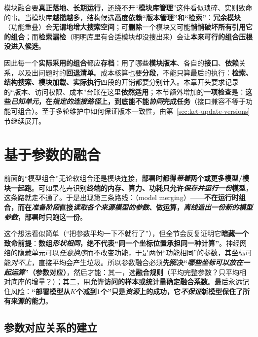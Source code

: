模块融合要\textbf{真正落地、长期运行}，还绕不开“\textbf{模块库管理}”这件看似琐碎、实则致命的事。当模块库\textbf{越攒越多}，结构候选\textbf{高度依赖“版本管理”和“检索”}：\textbf{冗余模块}（功能重叠）会\textbf{无谓地增大搜索空间}；可\textbf{删除}一个模块又可能\textbf{悄悄破坏所有引用它的组合}；而\textbf{检索漏检}（明明库里有合适模块却没搜出来）会让\textbf{本来可行的组合压根没进入候选}。

因此每一个\textbf{实际采用的组合}都应\textbf{存档}：用了哪些\textbf{模块版本}、各自的\textbf{接口}、\textbf{依赖}关系，以及出问题时的\textbf{回退清单}。成本核算也要\textbf{分段}，不能只算最后的执行：\textbf{检索、结构搜索、模块加载、实际执行}四段的开销都要分别计入。本章开头要求记录的“版本、访问权限、成本”台账在这里\textbf{依然适用}；本节额外增加的\textbf{一项检查}是：\textbf{这些\emph{已知单元}，在\emph{指定的连接路径}上，到底能不能\emph{协同}完成任务}（接口兼容不等于功能可组合）。至于多轮维护中如何保证版本一致性，由第~\ref{sec:ket-update-versions}节继续展开。

\section{基于参数的融合}
\label{sec:ket-integration-merging}

前面的“模型组合”无论软组合还是模块连接，\textbf{部署时都得\emph{带着}两个或更多模型/模块一起跑}。可如果花卉识别\textbf{终端的内存、算力、功耗只允许\emph{保存并运行一份}模型}，这条路就走不通了。于是出现第三条路线：（model merging）——\textbf{不在运行时组合，而在\emph{准备阶段}直接\emph{读取各个来源模型的参数}、做运算，\emph{离线造出一份\emph{新的}模型参数}，部署时只跑这一份}。

这个想法看似简单（“把参数平均一下不就行了”），但全节会反复证明它\textbf{暗藏一个致命前提}：\textbf{数组\emph{形状相同}，绝不代表“同一个坐标位置承担同一种计算”}。神经网络的隐藏单元可以\emph{任意换序}而不改变功能，于是两份“功能相同”的参数，其坐标可能\emph{对不上}，直接平均会产生垃圾。所以参数融合必须\textbf{先解决“\emph{哪些坐标可以放在一起运算}”（参数对应）}，然后才能：其一，选\textbf{融合规则}（平均完整参数？只平均相对底座的增量？）；其二，用\textbf{允许访问的样本或统计量确定融合系数}。最后永远记住风险：\textbf{“部署模型从$K$个减到1个”只是\emph{资源}上的成功，它\emph{不保证}新模型保住了所有来源的能力}。

\subsection{参数对应关系的建立}
\label{sec:ket-integration-alignment}

